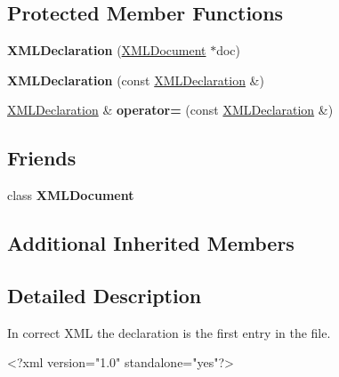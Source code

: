 \subsection*{Protected Member Functions}
\begin{DoxyCompactItemize}
\item 
\hypertarget{classtinyxml2_1_1_x_m_l_declaration_aef9586f2ce5df5feba74dde49a242b06}{}{\bfseries X\+M\+L\+Declaration} (\hyperlink{classtinyxml2_1_1_x_m_l_document}{X\+M\+L\+Document} $\ast$doc)\label{classtinyxml2_1_1_x_m_l_declaration_aef9586f2ce5df5feba74dde49a242b06}

\item 
\hypertarget{classtinyxml2_1_1_x_m_l_declaration_a5229cc0b31f034f93289af27ec3e2836}{}{\bfseries X\+M\+L\+Declaration} (const \hyperlink{classtinyxml2_1_1_x_m_l_declaration}{X\+M\+L\+Declaration} \&)\label{classtinyxml2_1_1_x_m_l_declaration_a5229cc0b31f034f93289af27ec3e2836}

\item 
\hypertarget{classtinyxml2_1_1_x_m_l_declaration_a79eb518c2c2b1b99a122a5d5a308b7ee}{}\hyperlink{classtinyxml2_1_1_x_m_l_declaration}{X\+M\+L\+Declaration} \& {\bfseries operator=} (const \hyperlink{classtinyxml2_1_1_x_m_l_declaration}{X\+M\+L\+Declaration} \&)\label{classtinyxml2_1_1_x_m_l_declaration_a79eb518c2c2b1b99a122a5d5a308b7ee}

\end{DoxyCompactItemize}
\subsection*{Friends}
\begin{DoxyCompactItemize}
\item 
\hypertarget{classtinyxml2_1_1_x_m_l_declaration_a4eee3bda60c60a30e4e8cd4ea91c4c6e}{}class {\bfseries X\+M\+L\+Document}\label{classtinyxml2_1_1_x_m_l_declaration_a4eee3bda60c60a30e4e8cd4ea91c4c6e}

\end{DoxyCompactItemize}
\subsection*{Additional Inherited Members}


\subsection{Detailed Description}
In correct X\+M\+L the declaration is the first entry in the file. \begin{DoxyVerb}    <?xml version="1.0" standalone="yes"?>
\end{DoxyVerb}


